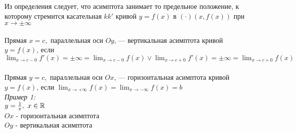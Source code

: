 \documentclass{article}
\begin{document}
Из определения следует, что асимптота занимает то предельное положение, к которому стремится касательная $kk'$ кривой $y = f(x)$ в $(\cdot) (x, f(x))$ при $x \to \pm \infty$ \\


 \\
Прямая $x = c,$ параллельная оси $Oy$, --- вертикальная асимптота кривой $y = f(x)$, если $\lim_{x \to c-0} f'(x) = \pm \infty = \lim_{x \to c-0} f(x) \vee \lim_{x \to c+0} f'(x) = \pm \infty = \lim_{x \to c+0} f(x)$ \\

 \\
Прямая $y = c,$ параллельная оси $Ox$, --- горизонтальная асимптота кривой $y = f(x)$, если $\lim_{x \to +\infty} f(x) = \lim_{x \to -\infty} f(x) = b$ \\

\textit{Пример 1:} \\
$y = \frac{1}{x}, \ x \in \mathbb{R}$ \\
$Ox$ - горизонтальная асимптота \\

$Oy$ - вертикальная асимптота\\
\end{document}
